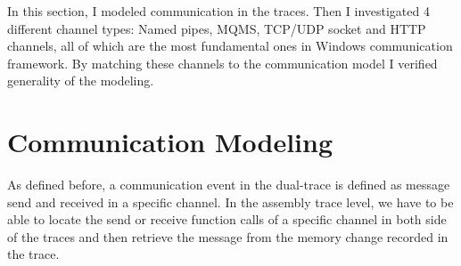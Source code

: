 \label{chapter:Mod}
In this section, I modeled communication in the traces. Then I investigated 4 different channel types: Named pipes, MQMS, TCP/UDP socket and HTTP channels, all of which are the most fundamental ones in Windows communication framework. By matching these channels to the communication model I verified generality of the modeling. 

\section{Communication Modeling}
As defined before, a communication event in the dual-trace is defined as message send and received in a specific channel. In the assembly trace level, we have to be able to locate the send or receive function calls of a specific channel in both side of the traces and then retrieve the message from the memory change recorded in the trace. 
